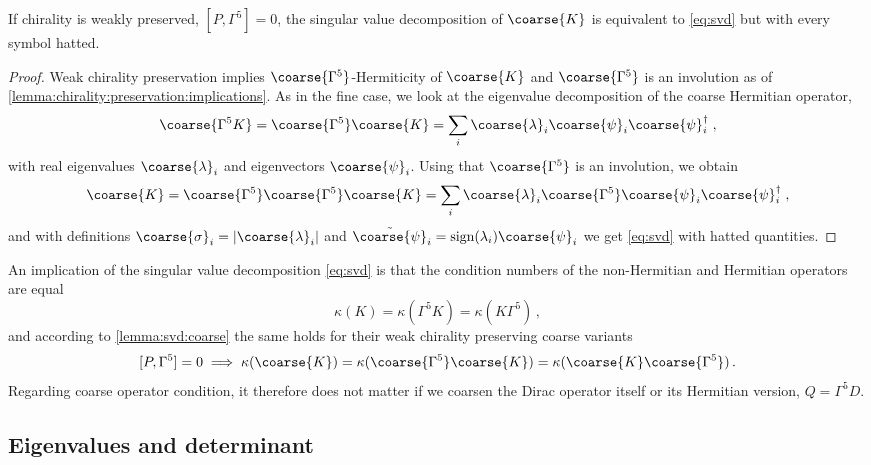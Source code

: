 \begin{lemma} \label{lemma:svd:coarse}
If chirality is weakly preserved, $[P, \Gamma^5]=0$, the singular value decomposition of $\coarse{K}$ is equivalent to \cref{eq:svd} but with every symbol hatted.
\end{lemma}

\begin{proof}
Weak chirality preservation implies $\coarse{\Gamma^{5}}$-Hermiticity of $\coarse{K}$ and $\coarse{\Gamma^{5}}$ is an involution as of \cref{lemma:chirality:preservation:implications}.
As in the fine case, we look at the eigenvalue decomposition of the coarse Hermitian operator,
\begin{equation}
\coarse{\Gamma^{5} K} = \coarse{\Gamma^{5}} \coarse{K} = \sum_{i} \coarse{\lambda}_i \coarse{\psi}_i \coarse{\psi}_i^{\dagger} \;,
\end{equation}
with real eigenvalues $\coarse{\lambda}_i$ and eigenvectors $\coarse{\psi}_i$. Using that $\coarse{\Gamma^{5}}$ is an involution, we obtain
\begin{equation}
\coarse{K} = \coarse{\Gamma^{5}} \coarse{\Gamma^{5}} \coarse{K} = \sum_{i} \coarse{\lambda}_i \coarse{\Gamma^{5}} \coarse{\psi}_i \coarse{\psi}_i^{\dagger} \;,
\end{equation}
and with definitions $\coarse{\sigma}_i = \lvert \coarse{\lambda}_i \rvert$ and $\tilde{\coarse{\psi}}_i = \text{sign}(\lambda_i) \coarse{\psi}_i$ we get \cref{eq:svd} with hatted quantities.
\end{proof}

An implication of the singular value decomposition \cref{eq:svd} is that the condition numbers of the non-Hermitian and Hermitian operators are equal
\begin{equation} \label{eq:cond:K:g5K:equal}
\kappa(K) = \kappa(\Gamma^{5} K) = \kappa(K \Gamma^{5}) \,,
\end{equation}
and according to \cref{lemma:svd:coarse} the same holds for their weak chirality preserving coarse variants
\begin{equation} \label{eq:cond:coarse:K:g5K:equal}
[P, \Gamma^{5}] = 0 \implies \kappa(\coarse{K}) = \kappa(\coarse{\Gamma^{5}} \coarse{K}) = \kappa(\coarse{K} \coarse{\Gamma^{5}}) \,.
\end{equation}
Regarding coarse operator condition, it therefore does not matter if we coarsen the Dirac operator itself or its Hermitian version, $Q=\Gamma^{5} D$.

\subsection{Eigenvalues and determinant}


